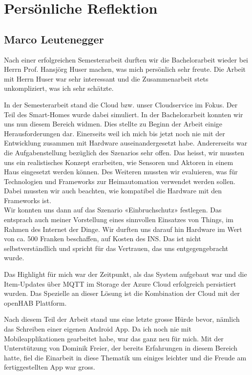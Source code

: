 \pagebreak
\section{Persönliche Reflektion}

\subsection*{Marco Leutenegger}
Nach einer erfolgreichen Semesterarbeit durften wir die Bachelorarbeit wieder bei Herrn Prof. Hansjörg Huser machen, was mich persönlich sehr freute. Die Arbeit mit Herrn Huser war sehr interessant und die Zusammenarbeit stets unkompliziert, was ich sehr schätzte.

In der Semesterarbeit stand die Cloud bzw. unser Cloudservice im Fokus. Der Teil des Smart-Homes wurde dabei simuliert. In der Bachelorarbeit konnten wir uns nun diesem Bereich widmen. Dies stellte zu Beginn der Arbeit einige Herausforderungen dar. Einerseits weil ich mich bis jetzt noch nie mit der Entwicklung zusammen mit Hardware auseinandergesetzt habe. Andererseits war die Aufgabenstellung bezüglich des Szenarios sehr offen. Das heisst, wir mussten uns ein realistisches Konzept erarbeiten, wie Sensoren und Aktoren in einem Haus eingesetzt werden können. Des Weiteren mussten wir evaluieren, was für Technologien und Frameworks zur Heimautomation verwendet werden sollen. Dabei mussten wir auch beachten, wie kompatibel die Hardware mit den Frameworks ist. \\
Wir konnten uns dann auf das Szenario «Einbruchschutz» festlegen. Das entsprach auch meiner Vorstellung eines sinnvollen Einsatzes von Things, im Rahmen des Internet der Dinge. Wir durften uns darauf hin Hardware im Wert von ca. 500 Franken beschaffen, auf Kosten des INS. Das ist nicht selbstverständlich und spricht für das Vertrauen, das uns entgegengebracht wurde.

Das Highlight für mich war der Zeitpunkt, als das System aufgebaut war und die Item-Updates über MQTT im Storage der Azure Cloud erfolgreich persistiert wurden. Das Spezielle an dieser Lösung ist die Kombination der Cloud mit der openHAB Plattform.

Nach diesem Teil der Arbeit stand uns eine letzte grosse Hürde bevor, nämlich das Schreiben einer eigenen Android App. Da ich noch nie mit Mobileapplikationen gearbeitet habe, war das ganz neu für mich. Mit der Unterstützung von Dominik Freier, der bereits Erfahrungen in diesem Bereich hatte, fiel die Einarbeit in diese Thematik um einiges leichter und die Freude am fertiggestellten App war gross.

